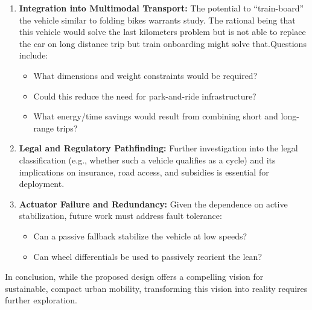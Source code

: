 \begin{enumerate}
    \item \textbf{Integration into Multimodal Transport:}  
    The potential to “train-board” the vehicle similar to folding bikes warrants study. The rational being that this vehicle would solve the last kilometers problem but is not able to replace the car on long distance trip but train onboarding might solve that.Questions include:
    \begin{itemize}
        \item What dimensions and weight constraints would be required?
        \item Could this reduce the need for park-and-ride infrastructure?
        \item What energy/time savings would result from combining short and long-range trips?
    \end{itemize}

    \item \textbf{Legal and Regulatory Pathfinding:}  
    Further investigation into the legal classification (e.g., whether such a vehicle qualifies as a cycle) and its implications on insurance, road access, and subsidies is essential for deployment.

    \item \textbf{Actuator Failure and Redundancy:}  
    Given the dependence on active stabilization, future work must address fault tolerance:
    \begin{itemize}
        \item Can a passive fallback stabilize the vehicle at low speeds?
        \item Can wheel differentials be used to passively reorient the lean?
    \end{itemize}
\end{enumerate}

In conclusion, while the proposed design offers a compelling vision for sustainable, compact urban mobility, transforming this vision into reality requires further exploration.

